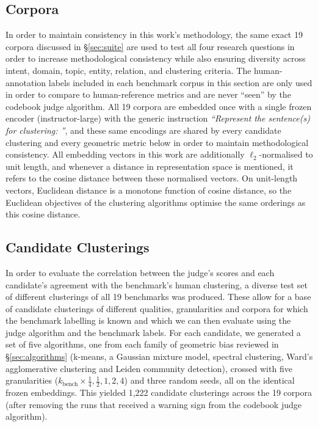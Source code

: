 \documentclass[11pt,a4paper,oneside]{report}
\begin{document}
\subsection{Corpora}

In order to maintain consistency in this work's methodology, the same exact 19 corpora discussed in \S\ref{sec:suite} are used to test all four research questions in order to increase methodological consistency while also ensuring diversity across intent, domain, topic, entity, relation, and clustering criteria. The human-annotation labels included in each benchmark corpus in this section are only used in order to compare to human-reference metrics and are never ``seen'' by the codebook judge algorithm. All 19 corpora are embedded once with a single frozen encoder ({\small\ttfamily instructor-large}) with the generic instruction \emph{``Represent the sentence(s) for clustering: ''}, and these same encodings are shared by every candidate clustering and every geometric metric below in order to maintain methodological consistency. All embedding vectors in this work are additionally $\ell_2$-normalised to unit length, and whenever a distance in representation space is mentioned, it refers to the cosine distance between these normalised vectors. On unit-length vectors, Euclidean distance is a monotone function of cosine distance, so the Euclidean objectives of the clustering algorithms optimise the same orderings as this cosine distance.

\subsection{Candidate Clusterings}

In order to evaluate the correlation between the judge's scores and each candidate's agreement with the benchmark's human clustering, a diverse test set of different clusterings of all 19 benchmarks was produced. These allow for a base of candidate clusterings of different qualities, granularities and corpora for which the benchmark labelling is known and which we can then evaluate using the judge algorithm and the benchmark labels. For each candidate, we generated a set of five algorithms, one from each family of geometric bias reviewed in \S\ref{sec:algorithms} (k-means, a Gaussian mixture model, spectral clustering, Ward's agglomerative clustering and Leiden community detection), crossed with five granularities ($k_{\mathrm{bench}} \times \tfrac14, \tfrac12, 1, 2, 4$) and three random seeds, all on the identical frozen embeddings. This yielded 1{,}222 candidate clusterings across the 19 corpora (after removing the runs that received a warning sign from the codebook judge algorithm).
\end{document}
